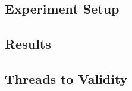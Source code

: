 \subsection{Experiment Setup}

	

\subsection{Results}


\subsection{Threads to Validity}



\endinput